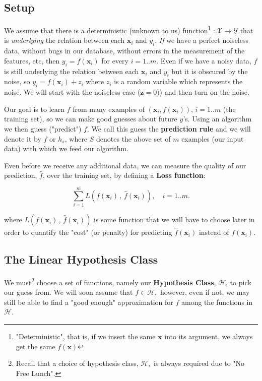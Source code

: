 \documentclass[11pt]{article}
\newcommand{\Xc}{\mathcal{X}}
\newcommand{\Yc}{\mathcal{Y}}
\newcommand{\Hc}{\mathcal{H}}
\begin{document}
\subsection{Setup}
We assume that there is a deterministic (unknown to us) function\footnote{"Deterministic", that is, if we insert the same $\mathbf{x}$ into its argument, we always get the same $f(\mathbf{x})$}
$:\Xc\to\Yc$ that is \textit{underlying} the relation between each $\mathbf{x}_i$ and $y_i$. \textit{If} we have a perfect noiseless data, without  bugs in our database, without errors in the measurement of the features, etc,  then  $y_i=f(\mathbf{x}_i)$ for every $i=1..m$. Even if we have a noisy data, $f$ is still underlying the relation between each $\mathbf{x}_i$ and $y_i$ but it is obscured by the noise, so $y_i=f(\mathbf{x}_i)+z_i$ where $z_i$ is a random variable which represents the noise. We will start with the noiseless case ($\mathbf{z}=0)$) and then turn on the noise.


Our goal is to learn $f$ from many examples of $(\mathbf{x}_i,f(\mathbf{x}_i))$, $i=1..m$  (the training set), so we can make good guesses about future $y$'s.
Using an algorithm we then guess ("predict") $f$. We call this guess the \textbf{prediction rule} and we will denote it by  $\hat{f}$ or $h_s$,   where $S$ denotes the above set of $m$ examples (our input data) with which we feed our algorithm.

Even before we receive any additional data, we can measure the quality of our prediction, $\hat{f}$, over the training set, by defining  a \textbf{Loss function}:

  \[
 \sum_{i=1}^m L(f(\mathbf{x}_i)\,,\,\hat{f}(\mathbf{x}_i)),\quad i=1..m.
  \]

where  $L(f(\mathbf{x}_i)\,,\,\hat{f}(\mathbf{x}_i))$  is some function that we will have to choose later in order to quantify the "cost" (or penalty) for predicting $\hat{f}(\mathbf{x}_i)$ instead of $f(\mathbf{x}_i)$.


\subsection{The Linear Hypothesis Class}

 We must\footnote{Recall that a choice of hypothesis class, $\Hc,$ is always required due to "No Free Lunch".}
 choose a set of functions, namely our \textbf{Hypothesis Class}, $\Hc$, to pick our guess from. We will soon assume that $f\in\Hc,$ however, even if not, we may still be able to find a "good enough" approximation for $f$ among the functions in $\Hc$.
\end{document}
